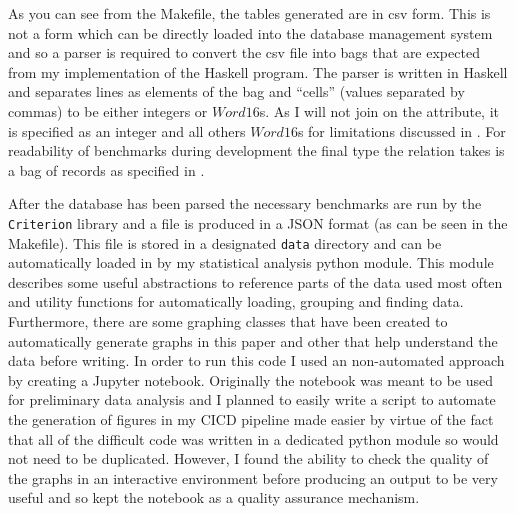 As you can see from the Makefile, the tables generated are in csv form. This is
not a form which can be directly loaded into the database management system and
so a parser is required to convert the csv file into bags that are expected from
my implementation of the Haskell program. The parser is written in Haskell and
separates lines as elements of the bag and ``cells'' (values separated by
commas) to be either integers or $Word16$s. As I will not join on the
 attribute, it is specified as an integer and all
others $Word16$s for limitations discussed in . For
readability of benchmarks during development the final type the
 relation takes is a bag of records as specified in
.

After the database has been parsed the necessary benchmarks are run by the
\verb|Criterion| library and a file is produced in a JSON format (as can be seen
in the Makefile). This file is stored in a designated \verb|data| directory and
can be automatically loaded in by my statistical analysis python module. This
module describes some useful abstractions to reference parts of the data used
most often and utility functions for automatically loading, grouping and finding
data. Furthermore, there are some graphing classes that have been created to
automatically generate graphs in this paper and other that help understand the
data before writing. In order to run this code I used an non-automated approach
by creating a Jupyter notebook. Originally the notebook was meant to be used for
preliminary data analysis and I planned to easily write a script to automate the
generation of figures in my CICD pipeline made easier by virtue of the fact that 
all of the difficult code was written in a dedicated python module so would not
need to be duplicated. However, I found the ability to check the quality of the
graphs in an interactive environment before producing an output to be very
useful and so kept the notebook as a quality assurance mechanism.
